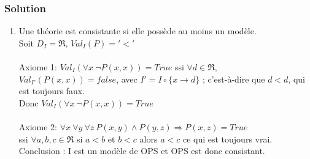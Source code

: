     \subsubsection*{Solution}
    \begin{enumerate}
    
	\item Une théorie est consistante si elle possède au moins un modèle.\\
    Soit $D_I = \Re$, $Val_I(P) = '<'$\\
    \\
    Axiome 1: $Val_I (\forall x \ \neg P(x,x)) = True$ ssi $\forall d \in \Re$, $Val_{I'} ( P(x,x)) = false$, avec $I' = I \circ \{x \rightarrow d\}$ ; c'est-à-dire que $d<d$, qui est toujours faux.\\
    Donc $Val_I (\forall x \ \neg P(x,x)) = True$\\
    \\
    Axiome 2: $\forall x \ \forall y \ \forall z \ P(x, y) \wedge P(y, z) \Rightarrow P(x, z)= True$ \\
    ssi $\forall a,b,c \in \Re $  si $a <b$ et $b<c$ alors $a<c$ ce qui est toujours vrai.\\
    Conclusion : I est un modèle de OPS et OPS est donc consistant.
    

\end{enumerate}

